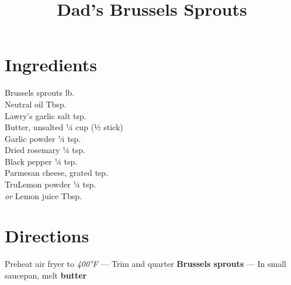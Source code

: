 \documentclass[11pt,letterpaper]{article}
\title{Dad's Brussels Sprouts}
\author{}
\date{}
\begin{document}
\maketitle
\thispagestyle{empty}

\section*{Ingredients}
\setlength{\columnsep}{20pt}
\begin{multicols}{2}
\noindent
    Brussels sprouts  lb. \\
    Neutral oil  Tbsp. \\
    Lawry's garlic salt  tsp. \\
    Butter, unsalted \dotfill ¼ cup (½ stick) \\
    Garlic powder \dotfill ¼ tsp. \\
    \columnbreak
    Dried rosemary \dotfill ¼ tsp. \\
    Black pepper \dotfill ¼ tsp. \\
    Parmesan cheese, grated  tsp. \\
    TruLemon powder \dotfill ¼ tsp. \\
    \textit{or} Lemon juice  Tbsp. \\
\end{multicols}

\section*{Directions}

\noindent
Preheat air fryer to \textit{400°F} ---
Trim and quarter \textbf{Brussels sprouts} ---
In small saucepan, melt \textbf{butter}
\end{document}
